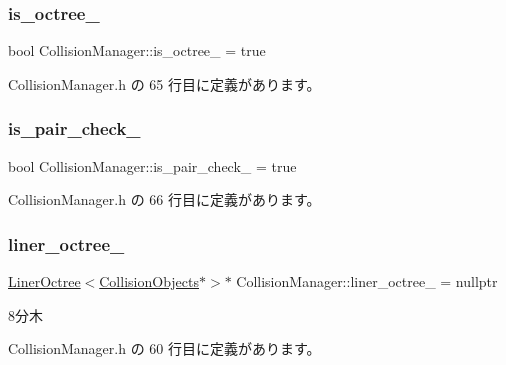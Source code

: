 \subsubsection{\texorpdfstring{is\+\_\+octree\+\_\+}{is\_octree\_}}
{\footnotesize\ttfamily bool Collision\+Manager\+::is\+\_\+octree\+\_\+ = true\hspace{0.3cm}{\ttfamily [private]}}



 Collision\+Manager.\+h の 65 行目に定義があります。

\mbox{\label{class_collision_manager_a5ba36f21dfb636d6b2c8b84bb07560ad}} 
\subsubsection{\texorpdfstring{is\+\_\+pair\+\_\+check\+\_\+}{is\_pair\_check\_}}
{\footnotesize\ttfamily bool Collision\+Manager\+::is\+\_\+pair\+\_\+check\+\_\+ = true\hspace{0.3cm}{\ttfamily [private]}}



 Collision\+Manager.\+h の 66 行目に定義があります。

\mbox{\label{class_collision_manager_aa7e8919f4e8af9764106a26a0cfcf6a7}} 
\subsubsection{\texorpdfstring{liner\+\_\+octree\+\_\+}{liner\_octree\_}}
{\footnotesize\ttfamily \mbox{\hyperlink{class_liner_octree}{Liner\+Octree}}$<$\mbox{\hyperlink{class_collision_objects}{Collision\+Objects}}$\ast$$>$$\ast$ Collision\+Manager\+::liner\+\_\+octree\+\_\+ = nullptr\hspace{0.3cm}{\ttfamily [private]}}



8分木 



 Collision\+Manager.\+h の 60 行目に定義があります。

